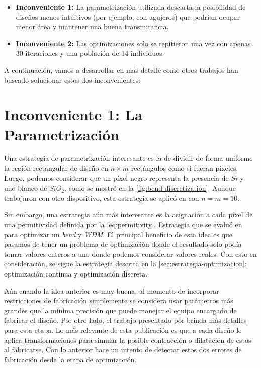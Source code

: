 \begin{itemize}
  \item \textbf{Inconveniente 1:} 
  La parametrización utilizada descarta la posibilidad de diseños menos 
  intuitivos (por ejemplo, con agujeros) que podrían ocupar menor área y mantener una buena transmitancia.
  
  \item \textbf{Inconveniente 2:}
  Las optimizaciones solo se repitieron una vez con apenas 30 iteraciones y una población de 14 individuos.

\end{itemize}


A continuación, vamos a desarrollar en más detalle como otros trabajos han buscado solucionar estos dos inconvenientes:

\section{Inconveniente 1: La Parametrización}

Una estrategia de parametrización interesante es la de dividir de forma uniforme la región rectangular de diseño en 
$n \times m$ rectángulos como si fueran píxeles.
Luego, podemos considerar que un píxel negro representa la presencia de $Si$ y uno blanco de $SiO_2$,
como se mostró en la \autoref{fig:bend-discretization}.
Aunque trabajaron con otro dispositivo, esta estrategia se aplicó en \cite{Malheiros-Silveira2020} con $n
= m = 10$.

Sin embargo, una estrategia aún más interesante es la asignación a cada píxel de una permitividad
definida por la \autoref{eq:permitivity}. Estrategia que se evaluó en \cite{Su2020} para optimizar un
\emph{bend} y \emph{WDM}. 
El principal beneficio de esta idea es que pasamos de tener un problema de optimización donde el resultado
solo podía tomar valores enteros a uno donde podemos considerar valores reales.
Con esto en consideración, se sigue la estrategia descrita en la \autoref{sec:estrategia-optimizacion}:
optimización continua y optimización discreta. 

Aún cuando la idea anterior es muy buena, al momento de incorporar restricciones de fabricación simplemente se
considera usar parámetros más grandes que la mínima precisión que puede manejar el equipo encargado de
fabricar el diseño.
Por otro lado, el trabajo presentado por \cite{Hammond20} brinda más detalles para esta etapa.
Lo más relevante de esta publicación es que a cada diseño le aplica transformaciones para simular la posible 
contracción o dilatación de estos al fabricarse.
Con lo anterior hace un intento de detectar estos dos errores de fabricación desde la etapa de optimización.

